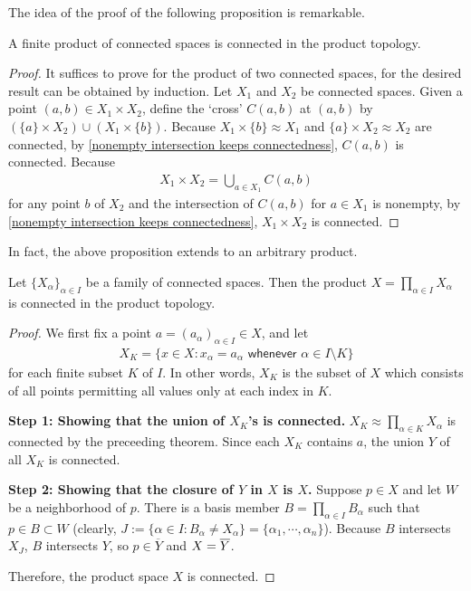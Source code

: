 The idea of the proof of the following proposition is remarkable.
\begin{thm}
    A finite product of connected spaces is connected in the product topology.
\end{thm}
\begin{proof}
    It suffices to prove for the product of two connected spaces, for the desired result can be obtained by induction.
    Let $X_1$ and $X_2$ be connected spaces.
    Given a point $(a, b)\in X_1\times X_2$, define the `cross' $C(a, b)$ at $(a, b)$ by $(\{a\}\times X_2)\cup(X_1\times\{b\})$.
    Because $X_1\times\{b\}\approx X_1$ and $\{a\}\times X_2\approx X_2$ are connected, by \cref{nonempty intersection keeps connectedness}, $C(a, b)$ is connected.
    Because
    \begin{align*}
        X_1\times X_2=\bigcup_{a\in X_1}C(a, b)
    \end{align*}
    for any point $b$ of $X_2$ and the intersection of $C(a, b)$ for $a\in X_1$ is nonempty, by \cref{nonempty intersection keeps connectedness}, $X_1\times X_2$ is connected.
\end{proof}

In fact, the above proposition extends to an arbitrary product.
\begin{thm}
    Let $\{X_\alpha\}_{\alpha\in I}$ be a family of connected spaces.
    Then the product $X=\prod_{\alpha\in I}X_\alpha$ is connected in the product topology.
\end{thm}
\begin{proof}
    We first fix a point $a=(a_\alpha)_{\alpha\in I}\in X$, and let
    \begin{align*}
        X_K=\{x\in X
        :
        x_\alpha=a_\alpha\textsf{ whenever }\alpha\in I\setminus K
        \}
    \end{align*}
    for each finite subset $K$ of $I$.
    In other words, $X_K$ is the subset of $X$ which consists of all points permitting all values only at each index in $K$.

    \textbf{Step 1: Showing that the union of $X_K$'s is connected.}\newline\noindent
    $X_K\approx\prod_{\alpha\in K}X_\alpha$ is connected by the preceeding theorem.
    Since each $X_K$ contains $a$, the union $Y$ of all $X_K$ is connected.

    \textbf{Step 2: Showing that the closure of $Y$ in $X$ is $X$.}\newline\noindent
    Suppose $p\in X$ and let $W$ be a neighborhood of $p$.
    There is a basis member $B=\prod_{\alpha\in I} B_\alpha$ such that $p\in B\subset W$ (clearly, $J:=\{\alpha\in I: B_\alpha\neq X_\alpha\}=\{\alpha_1, \cdots, \alpha_n\}$).
    Because $B$ intersects $X_J$, $B$ intersects $Y$, so $p\in\overline{Y}$ and $X=\overline{Y}$.

    Therefore, the product space $X$ is connected.
\end{proof}

